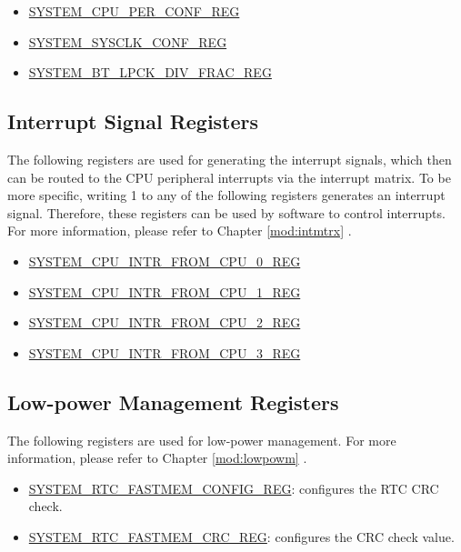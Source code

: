 \documentclass[main\_\_EN.tex]{subfiles}
\begin{document}
\begin{itemize}
    \item \hyperref[regdesc:SYSTEMCPUPERCONFREG]{SYSTEM\_CPU\_PER\_CONF\_REG}
    \item \hyperref[regdesc:SYSTEMSYSCLKCONFREG]{SYSTEM\_SYSCLK\_CONF\_REG}
    \item \hyperref[regdesc:SYSTEMBTLPCKDIVFRACREG]{SYSTEM\_BT\_LPCK\_DIV\_FRAC\_REG}
\end{itemize}

\subsection{Interrupt Signal Registers}

The following registers are used for generating the interrupt signals, which then can be routed to the CPU peripheral interrupts via the interrupt matrix. To be more specific, writing 1 to any of the following registers generates an interrupt signal. Therefore, these registers can be used by software to control interrupts. For more information, please refer to Chapter \ref{mod:intmtrx}
\textit{}.

\begin{itemize}
    \item \hyperref[fielddesc:SYSTEMCPUINTRFROMCPU0]{SYSTEM\_CPU\_INTR\_FROM\_CPU\_0\_REG}
    \item \hyperref[fielddesc:SYSTEMCPUINTRFROMCPU1]{SYSTEM\_CPU\_INTR\_FROM\_CPU\_1\_REG}
    \item \hyperref[fielddesc:SYSTEMCPUINTRFROMCPU2]{SYSTEM\_CPU\_INTR\_FROM\_CPU\_2\_REG}
    \item \hyperref[fielddesc:SYSTEMCPUINTRFROMCPU3]{SYSTEM\_CPU\_INTR\_FROM\_CPU\_3\_REG}
\end{itemize}


\subsection{Low-power Management Registers}

The following registers are used for low-power management. For more information, please refer to Chapter \ref{mod:lowpowm} \textit{}.
\begin{itemize}
    \item \hyperref[regdesc:SYSTEMRTCFASTMEMCONFIGREG]{SYSTEM\_RTC\_FASTMEM\_CONFIG\_REG}: configures the RTC CRC check.
    \item \hyperref[regdesc:SYSTEMRTCFASTMEMCRCREG]{SYSTEM\_RTC\_FASTMEM\_CRC\_REG}: configures the CRC check value.
\end{itemize}
\end{document}
